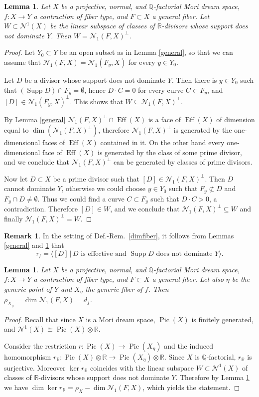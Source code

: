 \documentclass[a4paper,12pt]{amsart}
\newtheorem{lemma}[thm]{Lemma}
\theoremstyle{definition}
\newtheorem{remark}[thm]{Remark}
\numberwithin{figure}{section}
\numberwithin{table}{section}
\newcommand{\Q}{\mathbb{Q}}
\newcommand{\R}{\mathbb{R}}
\newcommand{\N}{\mathcal{N}_1}
\newcommand{\Nu}{\mathcal{N}^1}
\newcommand{\Pic}{\operatorname{Pic}}
\newcommand{\Supp}{\operatorname{Supp}}
\newcommand{\Eff}{\operatorname{Eff}}
\begin{document}
        \begin{lemma}\label{supp}
      Let $X$ be a projective, normal, and $\Q$-factorial Mori dream space, $f\colon X\to Y$ a contraction of fiber type, and $F\subset X$ a general fiber.
Let $W\subset\Nu(X)$ be the linear subspace of classes of $\R$-divisors whose support does not dominate $Y$.  
      Then $W=\N(F,X)^{\perp}$.
\end{lemma}
\begin{proof}
Let $Y_0\subset Y$ be an open subset as in Lemma \ref{general}, so that we can assume that $\N(F,X)=\N(F_y,X)$ for every $y\in Y_0$.
  
   Let $D$ be a divisor whose support does not dominate $Y$. Then there is $y\in Y_0$ such that $(\Supp D)\cap F_y=\emptyset$, hence $D\cdot C=0$ for every curve $C\subset F_y$, and $[D]\in \N(F_y,X)^{\perp}$. This shows that $W\subseteq \N(F,X)^{\perp}$.

  By Lemma \ref{general} $\N(F,X)^{\perp}\cap \Eff(X)$ is a face of $\Eff(X)$ of dimension equal to $\dim(\N(F,X)^{\perp})$, therefore  $\N(F,X)^{\perp}$ is generated by the one-dimensional faces of $\Eff(X)$ contained in it.
  On the other hand every one-dimensional face of $\Eff(X)$ is generated by the class of some prime divisor, and we conclude that $\N(F,X)^{\perp}$ can be generated by classes of prime divisors.

  Now let $D\subset X$ be a prime divisor such that $[D]\in\N(F,X)^{\perp}$. Then $D$ cannot dominate $Y$, otherwise we could choose $y\in Y_0$ such that $F_y\not\subset D$ and $F_y\cap D\neq\emptyset$. Thus we could find a curve $C\subset F_y$ such that $D\cdot C>0$, a contradiction. Therefore $[D]\in W$, and we conclude that $\N(F,X)^{\perp}\subseteq W$ and finally $\N(F,X)^{\perp}= W$.
\end{proof}
\begin{remark}\label{tauf}
  In the setting of Def.-Rem.~\ref{dimfiber}, it follows from Lemmas \ref{general} and \ref{supp} that
$$\tau_f=\langle [D]\,|\,\text{$D$ is effective and $\Supp D$  does not dominate $Y$}\rangle.$$
\end{remark}
\begin{lemma}\label{genrho}
Let $X$ be a projective, normal, and $\Q$-factorial Mori dream space, $f\colon X\to Y$ a contraction of fiber type, and $F\subset X$ a general fiber. Let also $\eta$ be the generic point of $Y$ and $X_{\eta}$ the generic fiber of $f$. Then $\rho_{X_\eta}=\dim\N(F,X)=d_f$.
\end{lemma}
\begin{proof}
Recall that since $X$ is a Mori dream space, 
$\Pic(X)$ is finitely generated, and $\Nu(X)\cong \Pic(X)\otimes\R$.

  Consider the restriction $r\colon \Pic(X)\to\Pic(X_{\eta})$ and the induced homomorphism $r_{\R}\colon \Pic(X)\otimes\R\to\Pic(X_{\eta})\otimes\R$. 
  Since $X$ is $\Q$-factorial, $r_{\R}$ is surjective. Moreover $\ker r_{\R}$ coincides with the  linear subspace $W\subset\Nu(X)$ of classes of $\R$-divisors whose support does not dominate $Y$.  Therefore by Lemma \ref{supp} we have $\dim\ker r_{\R}=\rho_X-\dim\N(F,X)$, which yields the statement.
\end{proof}
\end{document}
